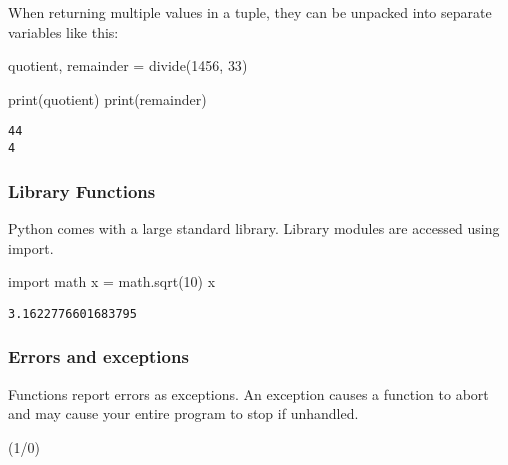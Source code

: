 \documentclass[
  letterpaper,
  DIV=11,
  numbers=noendperiod]{scrreprt}
\newenvironment{Shaded}{\begin{snugshade}}{\end{snugshade}}
\newcommand{\BuiltInTok}[1]{\textcolor[rgb]{0.00,0.46,0.62}{#1}}
\newcommand{\DecValTok}[1]{\textcolor[rgb]{0.68,0.00,0.00}{#1}}
\newcommand{\ImportTok}[1]{\textcolor[rgb]{0.00,0.46,0.62}{#1}}
\newcommand{\NormalTok}[1]{\textcolor[rgb]{0.00,0.46,0.62}{#1}}
\newcommand{\OperatorTok}[1]{\textcolor[rgb]{0.37,0.37,0.37}{#1}}
\begin{document}
When returning multiple values in a tuple, they can be unpacked into
separate variables like this:

\begin{Shaded}
\begin{Highlighting}[]
\NormalTok{quotient, remainder }\OperatorTok{=}\NormalTok{ divide(}\DecValTok{1456}\NormalTok{,  }\DecValTok{33}\NormalTok{)}
\end{Highlighting}
\end{Shaded}

\begin{Shaded}
\begin{Highlighting}[]
\BuiltInTok{print}\NormalTok{(quotient)}
\BuiltInTok{print}\NormalTok{(remainder)}
\end{Highlighting}
\end{Shaded}

\begin{verbatim}
44
4
\end{verbatim}

\hypertarget{library-functions}{%
\subsubsection{Library Functions}\label{library-functions}}

Python comes with a large standard library. Library modules are accessed
using import.

\begin{Shaded}
\begin{Highlighting}[]
\ImportTok{import}\NormalTok{ math}
\NormalTok{x }\OperatorTok{=}\NormalTok{ math.sqrt(}\DecValTok{10}\NormalTok{)}
\NormalTok{x}
\end{Highlighting}
\end{Shaded}

\begin{verbatim}
3.1622776601683795
\end{verbatim}

\hypertarget{errors-and-exceptions}{%
\subsubsection{Errors and exceptions}\label{errors-and-exceptions}}

Functions report errors as exceptions. An exception causes a function to
abort and may cause your entire program to stop if unhandled.

\begin{Shaded}
\begin{Highlighting}[]
\NormalTok{(}\DecValTok{1}\OperatorTok{/}\DecValTok{0}\NormalTok{)}
\end{Highlighting}
\end{Shaded}
\end{document}
